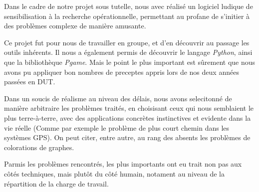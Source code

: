 Dans le cadre de notre projet sous tutelle, nous avec réalisé un logiciel ludique de sensibilisation
à la recherche opérationnelle, permettant au profane de s'initier à des problèmes
complexe de manière amusante.

Ce projet fut pour nous de travailler en groupe, et d'en découvrir au passage
les outils inhérents. Il nous a également permis de découvrir le langage
\emph{Python}, ainsi que la bibliothèque \emph{Pgame}.
Mais le point le plus important est sûrement que nous avons pu appliquer
bon nombres de preceptes appris lors de nos deux années passées en DUT.

Dans un soucis de réalisme au niveau des délais, nous avons selecitonné de
manière arbitraire les problèmes traités, en choisisant ceux qui nous
semblaient le plus terre-à-terre, avec des applications
concrètes instinctives et evidente dans la vie réelle
(Comme par exemple le problème de plus court chemin dans les systèmes GPS).
On peut citer, entre autre, au rang des absents les problèmes de colorations de graphes.

Parmis les problèmes rencontrés, les plus importants ont eu trait
non pas aux côtés techniques, mais plutôt du côté humain,
notament au niveau de la répartition de la charge de travail.
